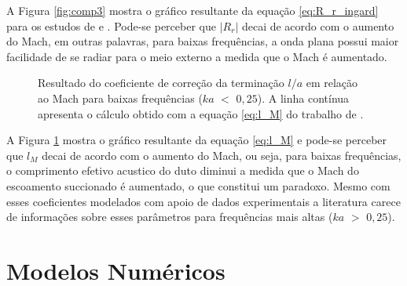 A Figura \ref{fig:comp3} mostra o gráfico resultante da equação \ref{eq:R_r_ingard} para os estudos de  e  . Pode-se perceber que $|R_{r}|$ decai de acordo com o aumento do Mach, em outras palavras, para baixas frequências, a onda plana possui maior facilidade de se radiar para o meio externo a medida que o Mach é aumentado. 


\begin{figure}[h!]
\centering
  \caption[Coeficiente de correção da terminação $l/a$]{Resultado do coeficiente de correção da terminação $l/a$ em relação ao Mach para baixas frequências ($ka$ $<$ $0,25$). A linha contínua apresenta o cálculo obtido com a equação \ref{eq:l_M} do trabalho de .}
  \label{fig:comp4}
\end{figure}

 A Figura \ref{fig:comp4} mostra o gráfico resultante da equação \ref{eq:l_M} e pode-se perceber que $l_{M}$ decai de acordo com o aumento do Mach, ou seja, para baixas frequências, o comprimento efetivo acustico do duto diminui a medida que o Mach do escoamento succionado é aumentado, o que constitui um paradoxo. Mesmo com esses coeficientes modelados com apoio de dados experimentais a literatura carece de informações sobre esses parâmetros para frequências mais altas ($ka$ $>$ $0,25$).


\section{Modelos Numéricos}

